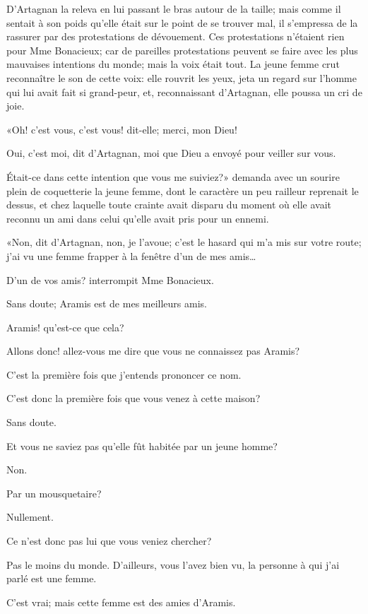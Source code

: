 D'Artagnan la releva en lui passant le bras autour de la taille; mais comme il sentait à son poids qu'elle était sur le point de se trouver mal, il s'empressa de la rassurer par des protestations de dévouement. Ces protestations n'étaient rien pour Mme Bonacieux; car de pareilles protestations peuvent se faire avec les plus mauvaises intentions du monde; mais la voix était tout. La jeune femme crut reconnaître le son de cette voix: elle rouvrit les yeux, jeta un regard sur l'homme qui lui avait fait si grand-peur, et, reconnaissant d'Artagnan, elle poussa un cri de joie. 

«Oh! c'est vous, c'est vous! dit-elle; merci, mon Dieu! 

\speak  Oui, c'est moi, dit d'Artagnan, moi que Dieu a envoyé pour veiller sur vous. 

\speak  Était-ce dans cette intention que vous me suiviez?» demanda avec un sourire plein de coquetterie la jeune femme, dont le caractère un peu railleur reprenait le dessus, et chez laquelle toute crainte avait disparu du moment où elle avait reconnu un ami dans celui qu'elle avait pris pour un ennemi. 

«Non, dit d'Artagnan, non, je l'avoue; c'est le hasard qui m'a mis sur votre route; j'ai vu une femme frapper à la fenêtre d'un de mes amis\dots 

\speak  D'un de vos amis? interrompit Mme Bonacieux. 

\speak  Sans doute; Aramis est de mes meilleurs amis. 

\speak  Aramis! qu'est-ce que cela? 

\speak  Allons donc! allez-vous me dire que vous ne connaissez pas Aramis? 

\speak  C'est la première fois que j'entends prononcer ce nom. 

\speak  C'est donc la première fois que vous venez à cette maison? 

\speak  Sans doute. 

\speak  Et vous ne saviez pas qu'elle fût habitée par un jeune homme? 

\speak  Non. 

\speak  Par un mousquetaire? 

\speak  Nullement. 

\speak  Ce n'est donc pas lui que vous veniez chercher? 

\speak  Pas le moins du monde. D'ailleurs, vous l'avez bien vu, la personne à qui j'ai parlé est une femme. 

\speak  C'est vrai; mais cette femme est des amies d'Aramis. 

